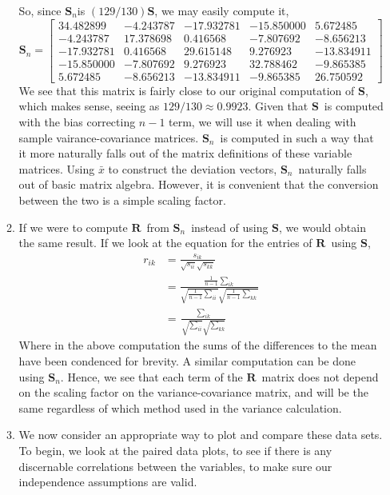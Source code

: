 \documentclass[letterpaper,10pt]{article}
\newcommand{\eS}{$\textbf{S}$}
\newcommand{\Sn}{$\textbf{S}_n$}
\newcommand{\R}{$\textbf{R}$}
\begin{document}
\begin{enumerate}
\begin{enumerate}
So, since \Sn is $(129/130)$\eS , we may easily compute it,
\[\textbf{S}_n=\begin{bmatrix}
34.482899 & -4.243787 & -17.932781 & -15.850000 &  5.672485\\
-4.243787 & 17.378698   & 0.416568  & -7.807692  & -8.656213\\
-17.932781  & 0.416568  & 29.615148   & 9.276923 & -13.834911\\
-15.850000 & -7.807692   & 9.276923 &  32.788462  & -9.865385\\
5.672485 & -8.656213 & -13.834911  & -9.865385  & 26.750592
\end{bmatrix} \]
We see that this matrix is fairly close to our original computation of \eS , which makes sense, seeing as $129/130\approx 0.9923$. Given that \eS \ is computed with the bias correcting $n-1$ term, we will use it when dealing with sample vairance-covariance matrices. \Sn \ is computed in such a way that it more naturally falls out of the matrix definitions of these variable matrices. Using $\bar{x}$ to construct the deviation vectors, \Sn \ naturally falls out of basic matrix algebra. However, it is convenient that the conversion between the two is a simple scaling factor.
\item If we were to compute \R \ from \Sn \ instead of using \eS , we would obtain the same result. If we look at the equation for the entries of \R \ using \eS ,
\begin{align*}
r_{ik}&=\frac{s_{ik}}{\sqrt{s_{ii}}\sqrt{s_{kk}}}\\
&=\frac{\frac{1}{n-1}\sum_{ik}}{\sqrt{\frac{1}{n-1}\sum_{ii}}\sqrt{\frac{1}{n-1}\sum_{kk}}}\\
&=\frac{\sum_{ik}}{\sqrt{\sum_{ii}}\sqrt{\sum_{kk}}}
\end{align*}
Where in the above computation the sums of the differences to the mean have been condenced for brevity. A similar computation can be done using \Sn . Hence, we see that each term of the \R \ matrix does not depend on the scaling factor on the variance-covariance matrix, and will be the same regardless of which method used in the variance calculation.
\item We now consider an appropriate way to plot and compare these data sets. To begin, we look at the paired data plots, to see if there is any discernable correlations between the variables, to make sure our independence assumptions are valid.
\begin{center}

\end{center}
\end{enumerate}
\end{enumerate}
\end{document}
